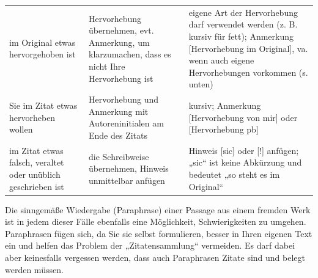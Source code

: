 \documentclass[]{book}
\theoremstyle{definition}
\theoremstyle{definition}
\theoremstyle{definition}
\theoremstyle{remark}
\begin{document}
\begin{longtable}[]{@{}lll@{}}
\begin{minipage}[t]{0.13\columnwidth}\raggedright\strut
im Original etwas hervorgehoben ist\strut
\end{minipage} & \begin{minipage}[t]{0.41\columnwidth}\raggedright\strut
Hervorhebung übernehmen, evt. Anmerkung, um klarzumachen, dass es nicht
Ihre Hervorhebung ist\strut
\end{minipage} & \begin{minipage}[t]{0.38\columnwidth}\raggedright\strut
eigene Art der Hervorhebung darf verwendet werden (z. B. kursiv für
fett); Anmerkung {[}Hervorhebung im Original{]}, va. wenn auch eigene
Hervorhebungen vorkommen (s. unten) \vspace{-6mm}\strut
\end{minipage}\tabularnewline
\begin{minipage}[t]{0.13\columnwidth}\raggedright\strut
Sie im Zitat etwas hervorheben wollen\strut
\end{minipage} & \begin{minipage}[t]{0.41\columnwidth}\raggedright\strut
Hervorhebung und Anmerkung mit Autoreninitialen am Ende des Zitats\strut
\end{minipage} & \begin{minipage}[t]{0.38\columnwidth}\raggedright\strut
kursiv; Anmerkung {[}Hervorhebung von mir{]} oder {[}Hervorhebung pb{]}
\vspace{-6mm}\strut
\end{minipage}\tabularnewline
\begin{minipage}[t]{0.13\columnwidth}\raggedright\strut
im Zitat etwas falsch, veraltet oder unüblich geschrieben ist\strut
\end{minipage} & \begin{minipage}[t]{0.41\columnwidth}\raggedright\strut
die Schreibweise übernehmen, Hinweis unmittelbar anfügen\strut
\end{minipage} & \begin{minipage}[t]{0.38\columnwidth}\raggedright\strut
Hinweis {[}sic{]} oder {[}!{]} anfügen; „sic`` ist keine Abkürzung und
bedeutet „so steht es im Original``\strut
\end{minipage}\tabularnewline
\bottomrule
\end{longtable}

Die sinngemäße Wiedergabe (Paraphrase) einer Passage aus einem fremden
Werk ist in jedem dieser Fälle ebenfalls eine Möglichkeit,
Schwierigkeiten zu umgehen. Paraphrasen fügen sich, da Sie sie selbst
formulieren, besser in Ihren eigenen Text ein und helfen das Problem der
„Zitatensammlung`` vermeiden. Es darf dabei aber keinesfalls vergessen
werden, dass auch Paraphrasen Zitate sind und belegt werden müssen.
\end{document}
